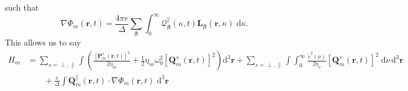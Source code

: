 \documentclass{article}
\begin{document}
such that
\begin{equation}
\nabla\Phi_m(\mathbf{r},t) = \frac{4\pi e}{\Delta}\sum_{\bm{\beta}}\int_0^\infty\mathcal{Q}_{\bm{\beta}}^\parallel(\kappa,t)\mathbf{L}_{\bm{\beta}}(\mathbf{r},\kappa)\;\mathrm{d}\kappa.
\end{equation}
This allows us to say
\begin{equation}\label{eq:Hm2}
\begin{split}
H_m &= \sum_{s = \perp,\parallel}\int\left(\frac{\left[\mathbf{P}_m^s(\mathbf{r},t)\right]^2}{2\eta_m} + \frac{1}{2}\eta_m\omega_0^2\left[\mathbf{Q}_m^s(\mathbf{r},t)\right]^2\right)\mathrm{d}^3\mathbf{r} + \sum_{s = \perp,\parallel}\int\int_0^\infty\frac{\tilde{v}^2(\nu)}{2\eta_\nu}\left[\mathbf{Q}_m^s(\mathbf{r},t)\right]^2\;\mathrm{d}\nu\,\mathrm{d}^3\mathbf{r}\\
&\qquad+ \frac{e}{\Delta}\int\mathbf{Q}_m^\parallel(\mathbf{r},t)\cdot\nabla\Phi_m(\mathbf{r},t)\;\mathrm{d}^3\mathbf{r}\\

\end{split}
\end{equation}
\end{document}
